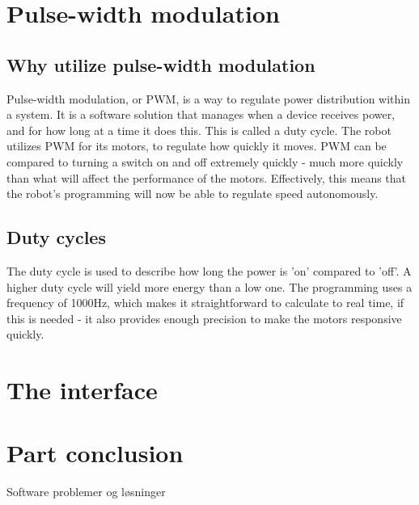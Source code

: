 \section{Pulse-width modulation}

\subsection {Why utilize pulse-width modulation}

Pulse-width modulation, or PWM, is a way to regulate power distribution within a system. It is a software solution that manages when a device receives power, and for how long at a time it does this. This is called a duty cycle. The robot utilizes PWM for its motors, to regulate how quickly it moves. PWM can be compared to turning a switch on and off extremely quickly - much more quickly than what will affect the performance of the motors. Effectively, this means that the robot's programming will now be able to regulate speed autonomously. 
 
\subsection {Duty cycles}

The duty cycle is used to describe how long the power is 'on' compared to 'off'. A higher duty cycle will yield more energy than a low one. The programming uses a frequency of 1000Hz, which makes it straightforward to calculate to real time, if this is needed - it also provides enough precision to make the motors responsive quickly.

\section{The interface}

\section{Part conclusion}
Software problemer og løsninger